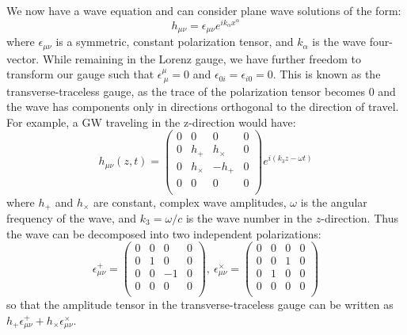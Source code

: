 \begin{refsection}
We now have a wave equation and can consider plane wave solutions of the form:
\begin{equation}
    h_{\mu\nu} = \epsilon_{\mu\nu} e^{i k_\alpha x^\alpha}
\end{equation}
where $\epsilon_{\mu\nu}$ is a symmetric, constant polarization tensor, and $k_\alpha$ is the wave four-vector.
While remaining in the Lorenz gauge, we have further freedom to transform our gauge such that $\epsilon^\mu_{\ \mu} = 0$ and $\epsilon_{0i} = \epsilon_{i0} = 0$.
This is known as the transverse-traceless gauge, as the trace of the polarization tensor becomes 0 and the wave has components only in directions orthogonal to the direction of travel.
For example, a GW traveling in the z-direction would have:
\begin{equation}
    h_{\mu\nu} (z, t) = 
    \begin{pmatrix}
        0 & 0 & 0 & 0 \\
        0 & h_+ & h_\times & 0 \\
        0 & h_\times & -h_+ & 0 \\
        0 & 0 & 0 & 0 \\
    \end{pmatrix}
    e^{i(k_3 z - \omega t)}
\end{equation}
where $h_+$ and $h_\times$ are constant, complex wave amplitudes, $\omega$ is the angular frequency of the wave, and $k_3 = \omega/c$ is the wave number in the $z$-direction.
Thus the wave can be decomposed into two independent polarizations:
\begin{equation}
    \epsilon^+_{\mu\nu} = 
    \begin{pmatrix}
        0 & 0 & 0 & 0 \\
        0 & 1 & 0 & 0 \\
        0 & 0 & -1 & 0 \\
        0 & 0 & 0 & 0\\
    \end{pmatrix},\ 
    \epsilon^\times_{\mu\nu} =
    \begin{pmatrix}
        0 & 0 & 0 & 0 \\
        0 & 0 & 1 & 0 \\
        0 & 1 & 0 & 0 \\
        0 & 0 & 0 & 0\\
    \end{pmatrix}
\end{equation}
so that the amplitude tensor in the transverse-traceless gauge can be written as $h_+\epsilon^+_{\mu\nu} + h_\times\epsilon^\times_{\mu\nu}$.


\end{refsection}
